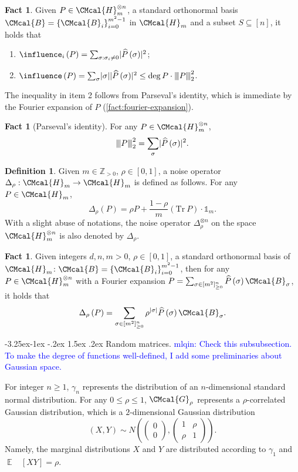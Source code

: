 \documentclass[11pt]{article}
\makeatletter
\renewcommand{\subsubsection}{\@startsection{subsubsection}{2}{\z@}%
             {-3.25ex\@plus -1ex \@minus -.2ex}%
             {1.5ex \@plus .2ex}%
             {\normalfont\normalsize\scshape\bfseries}}
\def\B{\CMcal{B}}
\def\G{\CMcal{G}}
\def\H{\CMcal{H}}
\theoremstyle{plain}
\theoremstyle{definition}
\newtheorem{definition}[theorem]{Definition}
\newtheorem{fact}[theorem]{Fact}
\newcommand {\minusspace} {\: \! \!}
\newcommand {\Fn} [2] {\ensuremath{ #1 \minusspace \Br{ #2 } }}
\newcommand {\set} [1] {\ensuremath{ \left\lbrace #1 \right\rbrace }}
\newcommand {\br} [1] {\ensuremath{ \left( #1 \right) }}
\newcommand {\Br} [1] {\ensuremath{ \left[ #1 \right] }}
\DeclarePairedDelimiter{\abs}{\lvert}{\rvert}
\DeclareMathOperator*{\bigE}{\mathbb{E}}
\newcommand {\expec} [2] {\Fn{\bigE_{\substack{#1}}}{#2}}
\newcommand{\nnorm}[1]{{\left\vert\kern-0.25ex\left\vert\kern-0.25ex\left\vert #1
		\right\vert\kern-0.25ex\right\vert\kern-0.25ex\right\vert}}
\newcommand {\Tr} {\ensuremath{ \mathrm{Tr} }}
\newcommand {\id} {\ensuremath{\mathds{1}}}
\newcommand{\posint}{{\mathbb Z}_{>0}}
\newcommand{\herspace}[1]{\ensuremath{\H_m^{\otimes #1}}}
\newcommand{\1}{\mathbb{1}} %
\newcommand{\mlqin}[1]{\textcolor{blue}{mlqin: {#1}}}
\makeatother
\begin{document}
\begin{fact}\label{lem:partialvariance}\cite[Lemma 2.16]{qin2021nonlocal}
Given $P\in\H_m^{\otimes n}$, a standard orthonormal basis $\B=\set{\B_i}_{i=0}^{m^2-1}$ in $\H_m$ and a subset $S\subseteq[n]$, it holds that
	\begin{enumerate}
		\item $\influence_i\br{P}=\sum_{\sigma:\sigma_i\neq0}\abs{\widehat{P}\br{\sigma}}^2$;
		\item $\influence\br{P}=\sum_{\sigma}\abs{\sigma}\abs{\widehat{P}\br{\sigma}}^2\leq\deg P\cdot\nnorm{P}^2_2$.
	\end{enumerate}
\end{fact}
The inequality in item 2 follows from Parseval's identity,
which is immediate by the Fourier expansion of $P$ (\cref{fact:fourier-expansion}). 
\begin{fact}[Parseval's identity]
    For any $P\in\H_m^{\otimes n}$,
    $$\nnorm{P}_2^2=\sum_{\sigma}\abs{\widehat{P}\br{\sigma}}^2.$$
\end{fact}


\begin{definition}\label{def:bonamibeckner}
	Given $m\in\posint$, $\rho\in[0,1]$, a noise operator $\Delta_{\rho}:\H_m\rightarrow\H_m$ is defined as follows. For any $P\in\H_m$,
	\[\Delta_{\rho}\br{P}=\rho P+\frac{1-\rho}{m}\br{\Tr~P}\cdot\id_m.\]
	With a slight abuse of notations, the noise operator $\Delta_{\rho}^{\otimes n}$ on the space $\herspace{n}$ is also denoted by $\Delta_{\rho}$.
\end{definition}
\begin{fact}\label{lem:bonamibecknerdef}\cite[Lemma 3.5]{qin2021nonlocal}
	Given integers $d,n,m>0$, $\rho\in[0,1]$, a standard orthonormal basis of $\H_m$: $\B=\set{\B_i}_{i=0}^{m^2-1}$, then for any $P\in\H_m^{\otimes n}$ with a Fourier expansion $P=\sum_{\sigma\in[m^2]_{\geq 0}^n}\widehat{P}\br{\sigma}\B_{\sigma}$, it holds that
		\[\Delta_{\rho}\br{P}=\sum_{\sigma\in[m^2]_{\geq 0}^n}\rho^{\abs{\sigma}}\widehat{P}\br{\sigma}\B_{\sigma}.\]
\end{fact}


\subsubsection{Random matrices.}
\mlqin{Check this subsubsection. To make the degree of functions well-defined, I add some preliminaries about Gaussian space.}

For integer $n\geq 1$, $\gamma_n$ represents the distribution of an $n$-dimensional  standard normal distribution. For any $0\leq \rho\leq 1$, $\G_{\rho}$ represents a  $\rho$-correlated Gaussian distribution, which is a  $2$-dimensional Gaussian distribution \[\br{X,Y}\sim N\br{\begin{pmatrix}
      0 \\
      0
    \end{pmatrix},\begin{pmatrix}
                    1 & \rho \\
                    \rho & 1
                  \end{pmatrix}}.\] Namely, the marginal distributions $X$ and $Y$ are distributed according to $\gamma_1$ and $\expec{}{XY}=\rho$.
\end{document}
